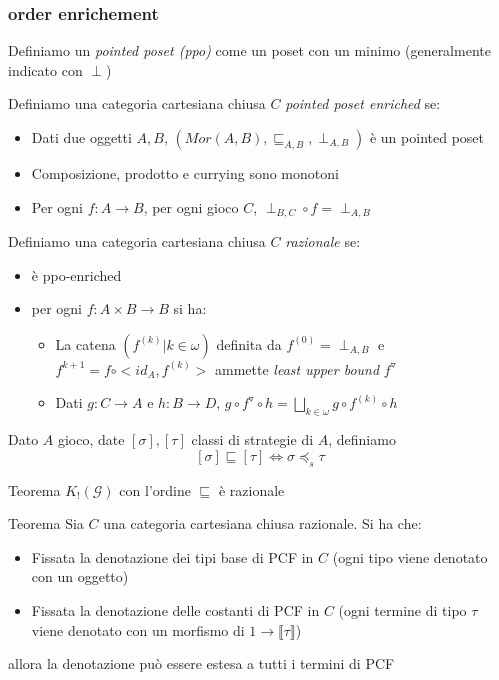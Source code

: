 \documentclass{beamer}
\begin{document}
\begin{frame}
	
	\frametitle{order enrichement}
	
	Definiamo un \emph{pointed poset (ppo)} come un poset con un minimo (generalmente indicato con $\perp$)
	
	Definiamo una categoria cartesiana chiusa $C$ \emph{pointed poset enriched} se:
	\begin{itemize}
		\item Dati due oggetti $A,B$, $(Mor(A,B),\sqsubseteq _{A,B},\perp _{A,B})$ è un pointed poset
		\item Composizione, prodotto e currying sono monotoni
		\item Per ogni $f: A\rightarrow B$, per ogni gioco $C$, $\perp_{B,C} \circ f = \perp _{A,B}$
	\end{itemize}
	
	Definiamo una categoria cartesiana chiusa $C$ \emph{razionale} se:
	\begin{itemize}
		\item è ppo-enriched
		\item per ogni $f: A\times B \rightarrow B$ si ha:
		\begin{itemize}
			\item La catena $(f^{(k)} | k\in \omega)$ definita da $f^{(0)}=\perp _{A,B}$ e $f^{k+1} = f \circ <id_A , f^{(k)}>$ ammette \emph{least upper bound} $f^{\triangledown}$
			\item Dati $g:C\rightarrow A$ e $h:B\rightarrow D$, $g\circ f^\triangledown \circ h = \bigsqcup_{k\in \omega} g \circ f^{(k)} \circ h$
		\end{itemize}

	\end{itemize}
	
\end{frame}

\begin{frame}
	
	Dato $A$ gioco, date $[\sigma],[\tau]$ classi di strategie di $A$, definiamo
	\[[\sigma] \sqsubseteq [\tau] \Leftrightarrow \sigma \preccurlyeq_s \tau\]
	\begin{block}{Teorema}
		$K_! (\mathcal{G})$ con l'ordine $\sqsubseteq$ è razionale
	\end{block}
	
	\begin{block}{Teorema}
		Sia $C$ una categoria cartesiana chiusa razionale. Si ha che:
		\begin{itemize}
			\item Fissata la denotazione dei tipi base di PCF in $C$ (ogni tipo viene denotato con un oggetto)
			\item Fissata la denotazione delle costanti di PCF in $C$ (ogni termine di tipo $\tau$ viene denotato con un morfismo di $1\rightarrow \llbracket \tau \rrbracket$)
		\end{itemize}
		allora la denotazione può essere estesa a tutti i termini di PCF
		
	\end{block}
	
\end{frame}
\end{document}
